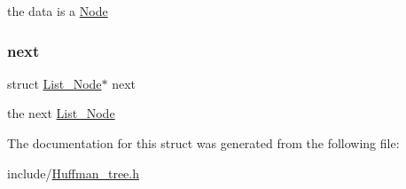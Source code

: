 the data is a \hyperlink{struct_node}{Node} \mbox{\label{struct_list___node_a953735a376f9ca61964264503df3340f}} 
\subsubsection{\texorpdfstring{next}{next}}
{\footnotesize\ttfamily struct \hyperlink{struct_list___node}{List\+\_\+\+Node}$\ast$ next}

the next \hyperlink{struct_list___node}{List\+\_\+\+Node} 

The documentation for this struct was generated from the following file\+:\begin{DoxyCompactItemize}
\item 
include/\hyperlink{_huffman__tree_8h}{Huffman\+\_\+tree.\+h}\end{DoxyCompactItemize}
